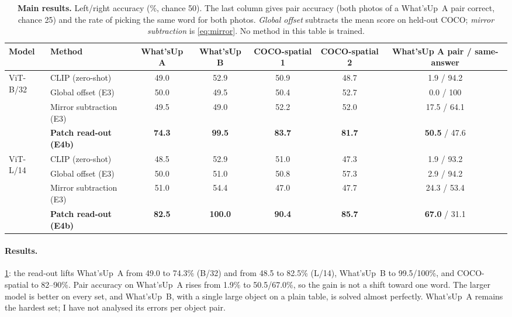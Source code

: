 \documentclass[10pt,twocolumn,letterpaper]{article}
\begin{document}
\begin{table}[t]
\centering
\small
\setlength{\tabcolsep}{4.5pt}
\begin{tabular}{@{}llccccc@{}}
\toprule
Model & Method & What'sUp A & What'sUp B & COCO-spatial 1 & COCO-spatial 2 & What'sUp A pair / same-answer \\
\midrule
\multirow{4}{*}{ViT-B/32}
 & CLIP (zero-shot)              & 49.0 & 52.9 & 50.9 & 48.7 & \phantom{0}1.9 / 94.2 \\
 & Global offset (E3)            & 50.0 & 49.5 & 50.4 & 52.7 & \phantom{0}0.0 / 100 \\
 & Mirror subtraction (E3)       & 49.5 & 49.0 & 52.2 & 52.0 & 17.5 / 64.1 \\
 & \textbf{Patch read-out (E4b)} & \textbf{74.3} & \textbf{99.5} & \textbf{83.7} & \textbf{81.7} & \textbf{50.5} / 47.6 \\
\midrule
\multirow{4}{*}{ViT-L/14}
 & CLIP (zero-shot)              & 48.5 & 52.9 & 51.0 & 47.3 & \phantom{0}1.9 / 93.2 \\
 & Global offset (E3)            & 50.0 & 51.0 & 50.8 & 57.3 & \phantom{0}2.9 / 94.2 \\
 & Mirror subtraction (E3)       & 51.0 & 54.4 & 47.0 & 47.7 & 24.3 / 53.4 \\
 & \textbf{Patch read-out (E4b)} & \textbf{82.5} & \textbf{100.0} & \textbf{90.4} & \textbf{85.7} & \textbf{67.0} / 31.1 \\
\bottomrule
\end{tabular}
\caption{\textbf{Main results.} Left/right accuracy (\%, chance 50). The last column gives pair accuracy (both photos of a What'sUp~A pair correct, chance 25) and the rate of picking the same word for both photos. \emph{Global offset} subtracts the mean score on held-out COCO; \emph{mirror subtraction} is \cref{eq:mirror}. No method in this table is trained.}
\label{tab:main}
\end{table}

\paragraph{Results.}
\cref{tab:main}: the read-out lifts What'sUp~A from 49.0 to 74.3\% (B/32) and from 48.5 to 82.5\% (L/14), What'sUp~B to 99.5/100\%, and COCO-spatial to 82--90\%.
Pair accuracy on What'sUp~A rises from 1.9\% to 50.5/67.0\%, so the gain is not a shift toward one word.
The larger model is better on every set, and What'sUp~B, with a single large object on a plain table, is solved almost perfectly.
What'sUp~A remains the hardest set; I have not analysed its errors per object pair.
\end{document}
